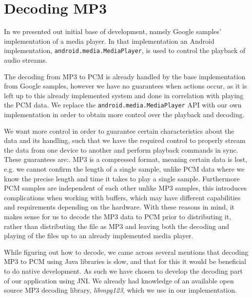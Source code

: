 \section{Decoding MP3}
In  we presented out initial base of development, namely Google samples' implementation of a media player.
In that implementation an Android implementation, \texttt{android.media.MediaPlayer}, is used to control the playback of audio streams.

The decoding from MP3 to \ac{PCM} is already handled by the base implementation from Google samples, however we have no guarantees when actions occur, as it is left up to this already implemented system and done in correlation with playing the \ac{PCM} data.
We replace the \texttt{android.media.MediaPlayer} API with our own implementation in order to obtain more control over the playback and decoding.

We want more control in order to guarantee certain characteristics about the data and its handling, such that we have the required control to properly stream the data from one device to another and perform playback commands in sync.
These guarantees are:.
MP3 is a compressed format, meaning certain data is lost, e.g. we cannot confirm the length of a single sample, unlike \ac{PCM} data where we know the precise length and time it takes to play a single sample.
Furthermore \ac{PCM} samples are independent of each other unlike MP3 samples, this introduces complications when working with buffers, which may have different capabilities and requirements depending on the hardware.
With these reasons in mind, it makes sense for us to decode the MP3 data to \ac{PCM} prior to distributing it, rather than distributing the file as MP3 and leaving both the decoding and playing of the files up to an already implemented media player.
\bigskip

While figuring out how to decode, we came across several mentions that decoding MP3 to \ac{PCM} using Java libraries is slow, and that for this it would be beneficial to do native development\cite{slow_java_stackoverflow}\cite{slow_java_lib}.
As such we have chosen to develop the decoding part of our application using \ac{JNI}.
We already had knowledge of an available open source MP3 decoding library, \textit{libmpg123}, which we use in our implementation.
%

